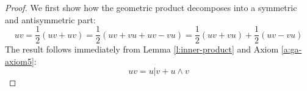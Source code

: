 \begin{proof}
	We first show how the geometric product decomposes into a symmetric and antisymmetric part:
	\[uv = \frac{1}{2}(uv + uv) = \frac{1}{2}(uv + vu + uv - vu) = \frac{1}{2}(uv + vu) + \frac{1}{2}(uv - vu)\]
	The result follows immediately from Lemma \ref{l:inner-product} and Axiom \ref{a:ga-axiom5}:
	\[uv = u | v + u \wedge v\]
\end{proof}
